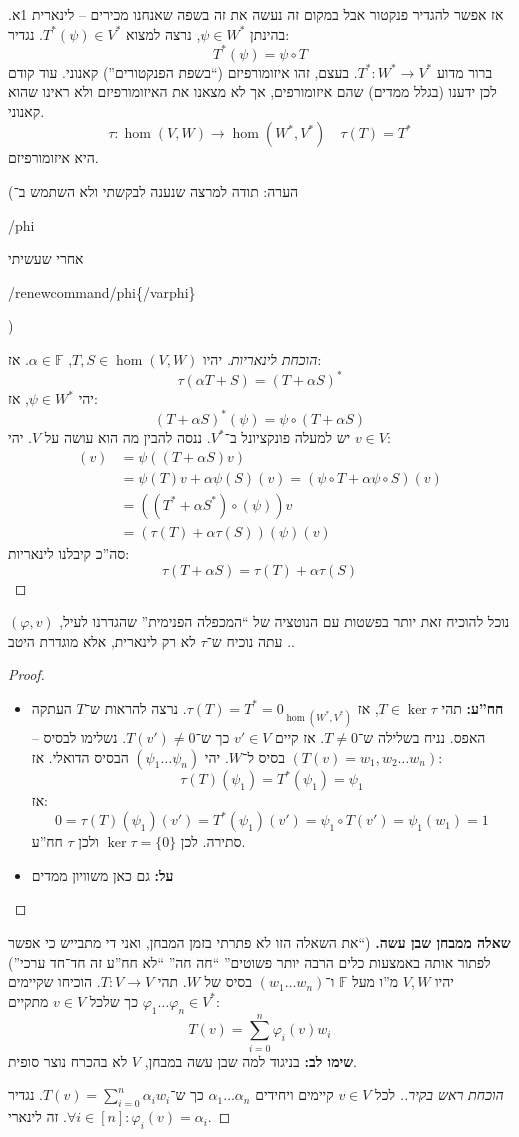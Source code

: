 \documentclass[a4paper]{article}
\newcommand\en[1] {\begin{otherlanguage}{english}#1\end{otherlanguage}}
\newcommand\sumni     {\sum_{i = 0}^{n}}
\newcommand\F         {\mathbb{F}}
\newcommand\co        {\colon}
\newcommand\ag        {\alpha}
\renewcommand\phi     {\varphi}
\theoremstyle{definition}
\begin{document}
	אז אפשר להגדיר פנקטור אבל במקום זה נעשה את זה בשפה שאנחנו מכירים – לינארית 1א. בהינתן $\psi \in W^*$, נרצה למצוא $T^*(\psi) \in V^*$. נגדיר: 
	\[ T^*(\psi) = \psi \circ T \]
	ברור מדוע $T^* \co W^* \to V^*$. בעצם, זהו איזומורפיזם (``בשפת הפנקטורים'') קאנוני. עוד קודם לכן ידענו (בגלל ממדים) שהם איזומורפים, אך לא מצאנו את האיזומורפיזם ולא ראינו שהוא קאנוני. 
	\[ \tau \co \hom(V, W) \to \hom(W^*, V^*) \quad \tau(T) = T^*  \]
	היא איזומורפיזם. 
	
	(הערה: תודה למרצה שנענה לבקשתי ולא השתמש ב־\en{\slash phi} אחרי שעשיתי \en{\slash renewcommand\slash phi\{\slash varphi\}})
	\begin{proof}[הוכחת לינאריות]
		יהיו $T, S \in \hom(V, W)$, $\ag \in \F$. אז: 
		\[ \tau(\ag T + S) = (T + \ag S)^* \]
		יהי $\psi \in W^*$, אז: 
		\[ (T + \ag S)^*(\psi) = \psi \circ (T + \ag S) \]
		יש למעלה פונקציונל ב־$V^*$. ננסה להבין מה הוא עושה על $V$. יהי $v \in V$: 
		\begin{align*}
			[\psi (T + \ag S)](v) &= \psi((T + \ag S)v) \\ 
			&= \psi(T)v + \ag \psi(S)(v) = (\psi\circ T + \ag \psi\circ S)(v) \\
			&= ((T^* + \ag S^*)\circ (\psi))v \\
			&= (\tau(T) + \ag \tau(S))(\psi)(v)
		\end{align*}
		סה''כ קיבלנו לינאריות: 
		\[ \tau(T + \ag S) = \tau(T) + \ag \tau(S) \]
	\end{proof}
	נוכל להוכיח זאת יותר בפשטות עם הנוטציה של ``המכפלה הפנימית'' שהגדרנו לעיל, $(\phi, v)$. 
	עתה נוכיח ש־$\tau$ לא רק לינארית, אלא מוגדרת היטב. 
	\begin{proof}\,
		\begin{itemize}
			\item \textbf{חח''ע: }תהי $T \in \ker \tau$, אז $\tau(T) = T^* = 0_{\hom(W^*, V^*)}$. נרצה להראות ש־$T$ העתקה האפס. נניח בשלילה ש־$T \neq 0$. אז קיים $v' \in V$ כך ש־$T(v') \neq 0$. נשלימו לבסיס – $(T(v) = w_1, w_2 \dots w_n)$ בסיס ל־$W$. יהי $(\psi_1 \dots \psi_n)$ הבסיס הדואלי. אז:
			\[ \tau(T)(\psi_1) = T^*(\psi_1) = \psi_1  \]
			אז: 
			\[ 0 = \tau(T)(\psi_1)(v') = T^*(\psi_1)(v') = \psi_1 \circ T(v') = \psi_1(w_1) = 1 \]
			סתירה. לכן $\ker \tau = \{0\}$ ולכן $\tau$ חח''ע. 
			\item \textbf{על: }גם כאן משוויון ממדים
		\end{itemize}
	\end{proof}
	
	\textbf{שאלה ממבחן שבן עשה. }(``את השאלה הזו לא פתרתי בזמן המבחן, ואני די מתבייש כי אפשר לפתור אותה באמצעות כלים הרבה יותר פשוטים'' ``חה חה'' ``לא חח''ע זה חד־חד ערכי'') יהיו $V, W$ מ''ו מעל $\F$ ו־$(w_1 \dots w_n)$ בסיס של $W$. תהי $T \co V \to V$. הוכיחו שקיימים $\phi_1 \dots \phi_n \in V^*$ כך שלכל $v \in V$ מתקיים: 
	\[ T(v) = \sumni \phi_i(v) w_i \]
	\textbf{שימו לב: }בניגוד למה שבן עשה במבחן, $V$ לא בהכרח נוצר סופית. 
	\begin{proof}[הוכחת ראש בקיר.]
		לכל $v \in V$ קיימים ויחידים $\ag_1 \dots \ag_n$ כך ש־$T(v) = \sumni \ag_i w_i$. נגדיר $\forall i \in [n] \co \phi_i(v) = \ag_i$. זה לינארי. 
	\end{proof}
	
\end{document}
